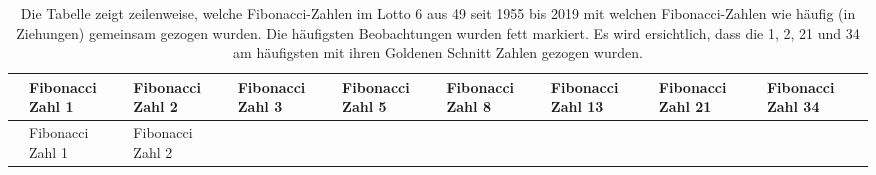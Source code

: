 \documentclass[ngerman,]{article}
\begin{document}
\begin{longtable}[]{@{}lllllllll@{}}
\caption{Die Tabelle zeigt zeilenweise, welche Fibonacci-Zahlen im Lotto
6 aus 49 seit 1955 bis 2019 mit welchen Fibonacci-Zahlen wie häufig (in
Ziehungen) gemeinsam gezogen wurden. Die häufigsten Beobachtungen wurden
fett markiert. Es wird ersichtlich, dass die 1, 2, 21 und 34 am
häufigsten mit ihren Goldenen Schnitt Zahlen gezogen
wurden.}\tabularnewline
\toprule
\begin{minipage}[b]{0.19\columnwidth}\raggedright\strut
\strut
\end{minipage} & \begin{minipage}[b]{0.07\columnwidth}\raggedright\strut
Fibonacci Zahl 1\strut
\end{minipage} & \begin{minipage}[b]{0.07\columnwidth}\raggedright\strut
Fibonacci Zahl 2\strut
\end{minipage} & \begin{minipage}[b]{0.07\columnwidth}\raggedright\strut
Fibonacci Zahl 3\strut
\end{minipage} & \begin{minipage}[b]{0.07\columnwidth}\raggedright\strut
Fibonacci Zahl 5\strut
\end{minipage} & \begin{minipage}[b]{0.07\columnwidth}\raggedright\strut
Fibonacci Zahl 8\strut
\end{minipage} & \begin{minipage}[b]{0.07\columnwidth}\raggedright\strut
Fibonacci Zahl 13\strut
\end{minipage} & \begin{minipage}[b]{0.07\columnwidth}\raggedright\strut
Fibonacci Zahl 21\strut
\end{minipage} & \begin{minipage}[b]{0.07\columnwidth}\raggedright\strut
Fibonacci Zahl 34\strut
\end{minipage}\tabularnewline
\midrule
\endfirsthead
\toprule
\begin{minipage}[b]{0.19\columnwidth}\raggedright\strut
\strut
\end{minipage} & \begin{minipage}[b]{0.07\columnwidth}\raggedright\strut
Fibonacci Zahl 1\strut
\end{minipage} & \begin{minipage}[b]{0.07\columnwidth}\raggedright\strut
Fibonacci Zahl 2\strut
\end{minipage} & \begin{minipage}[b]{0.07\columnwidth}\raggedright\strut

\end{minipage}
\end{longtable}
\end{document}
